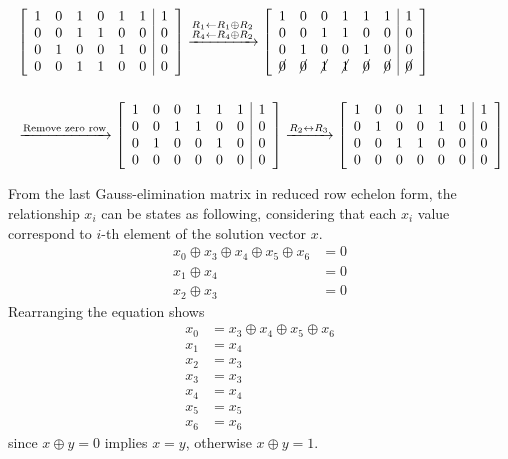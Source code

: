 \documentclass[11pt,a4paper]{article}
\begin{document}
\begin{align*}
&\left[
\begin{array}{cccccc|c}
1 & 0 & 1 & 0 & 1 & 1 & 1 \\
0 & 0 & 1 & 1 & 0 & 0 & 0 \\
0 & 1 & 0 & 0 & 1 & 0 & 0 \\
0 & 0 & 1 & 1 & 0 & 0 & 0 
\end{array}
\right]
\xrightarrow{\substack{R_1 \leftarrow R_1 \oplus R_2 \\ R_4 \leftarrow R_4 \oplus R_2}}
\left[
\begin{array}{cccccc|c}
1 & 0 & 0 & 1 & 1 & 1 & 1 \\
0 & 0 & 1 & 1 & 0 & 0 & 0 \\
0 & 1 & 0 & 0 & 1 & 0 & 0 \\
\cancel{0} & \cancel{0} & \cancel{1} & \cancel{1} & \cancel{0} & \cancel{0} & \cancel{0}
\end{array}
\right] \\[1.5em]
&\xrightarrow{\text{Remove zero row}}
\left[
\begin{array}{cccccc|c}
1 & 0 & 0 & 1 & 1 & 1 & 1 \\
0 & 0 & 1 & 1 & 0 & 0 & 0 \\
0 & 1 & 0 & 0 & 1 & 0 & 0 \\
0 & 0 & 0 & 0 & 0 & 0 & 0
\end{array}
\right]
\xrightarrow{R_2 \leftrightarrow R_3}
\left[
\begin{array}{cccccc|c}
1 & 0 & 0 & 1 & 1 & 1 & 1 \\
0 & 1 & 0 & 0 & 1 & 0 & 0 \\
0 & 0 & 1 & 1 & 0 & 0 & 0 \\
0 & 0 & 0 & 0 & 0 & 0 & 0
\end{array}
\right]
\end{align*}

From the last Gauss-elimination matrix in reduced row echelon form, the relationship $x_i$ can be states as following, considering that each $x_i$ value correspond to $i$-th element of the solution vector $x$.
\[
\begin{aligned}
x_0 \oplus x_3 \oplus x_4 \oplus x_5 \oplus x_6 &= 0 \\
x_1 \oplus x_4                                  &= 0 \\
x_2 \oplus x_3                                  &= 0
\end{aligned}
\]
Rearranging the equation shows
\[
\begin{aligned}
x_0 &= x_3 \oplus x_4 \oplus x_5 \oplus x_6 \\
x_1 &= x_4 \\
x_2 &= x_3 \\
x_3 &= x_3 \\
x_4 &= x_4 \\
x_5 &= x_5 \\
x_6 &= x_6
\end{aligned}
\]
since $x \oplus y = 0$ implies $x = y$, otherwise $x \oplus y = 1$.
\end{document}
